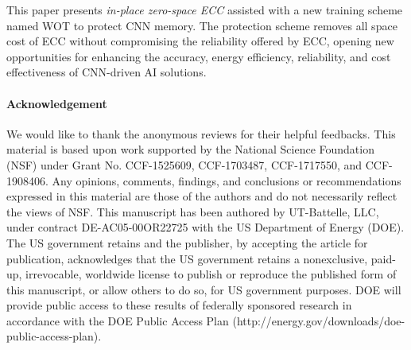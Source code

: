 \documentclass{article}
\begin{document}
This paper presents {\em in-place zero-space ECC} assisted with a new training scheme named WOT to protect CNN memory. The  protection scheme removes all space cost of ECC without compromising the reliability offered by ECC, opening new opportunities for enhancing the accuracy, energy efficiency, reliability, and cost effectiveness of CNN-driven AI solutions. 

\paragraph{Acknowledgement}
We would like to thank the anonymous reviews for their helpful feedbacks. This material is based upon work supported by the National Science Foundation (NSF) under Grant 
No. CCF-1525609, CCF-1703487, CCF-1717550, and CCF-1908406. Any opinions, comments, findings, and conclusions or recommendations expressed in this material are those of the authors and do not necessarily reflect the views of NSF. This manuscript has been authored by UT-Battelle, LLC, under contract DE-AC05-00OR22725 with the US Department of Energy (DOE). The US government retains and the publisher, by accepting the article for publication, acknowledges that the US government retains a nonexclusive, paid-up, irrevocable, worldwide license to publish or reproduce the published form of this manuscript, or allow others to do so, for US government purposes. DOE will provide public access to these results of federally sponsored research in accordance with the DOE Public Access Plan (http://energy.gov/downloads/doe-public-access-plan).

 

\end{document}
